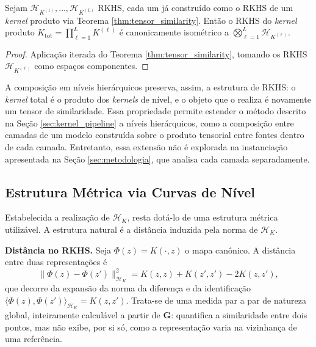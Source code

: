 \begin{corollary}\label{cor:recursive_composition}
Sejam $\mathcal{H}_{K^{(1)}}, \dots, \mathcal{H}_{K^{(L)}}$ RKHS, cada um já construído como o RKHS de um \textit{kernel} produto via Teorema \ref{thm:tensor_similarity}. Então o RKHS do \textit{kernel} produto $K_{\mathrm{tot}} = \prod_{\ell=1}^{L} K^{(\ell)}$ é canonicamente isométrico a $\bigotimes_{\ell=1}^{L} \mathcal{H}_{K^{(\ell)}}$.
\end{corollary}

\begin{proof}
Aplicação iterada do Teorema \ref{thm:tensor_similarity}, tomando os RKHS $\mathcal{H}_{K^{(\ell)}}$ como espaços componentes.
\end{proof}

A composição em níveis hierárquicos preserva, assim, a estrutura de RKHS: o \textit{kernel} total é o produto dos \textit{kernels} de nível, e o objeto que o realiza é novamente um tensor de similaridade. Essa propriedade permite estender o método descrito na Seção \ref{sec:kernel_pipeline} a níveis hierárquicos, como a composição entre camadas de um modelo construída sobre o produto tensorial entre fontes dentro de cada camada. Entretanto, essa extensão não é explorada na instanciação apresentada na Seção \ref{sec:metodologia}, que analisa cada camada separadamente.

\subsection{Estrutura Métrica via Curvas de Nível}\label{subsec:metric}
 
Estabelecida a realização de $\mathcal{H}_K$, resta dotá-lo de uma estrutura métrica utilizável. A estrutura natural é a distância induzida pela norma de $\mathcal{H}_K$.
 
\textbf{Distância no RKHS.} Seja $\Phi(z) = K(\cdot, z)$ o mapa canônico. A distância entre duas representações é
\begin{equation}\label{eq:rkhs_distance}
    \|\Phi(z) - \Phi(z')\|_{\mathcal{H}_K}^2 = K(z, z) + K(z', z') - 2 K(z, z'),
\end{equation}
que decorre da expansão da norma da diferença e da identificação $\langle \Phi(z), \Phi(z')\rangle_{\mathcal{H}_K} = K(z, z')$. Trata-se de uma medida par a par de natureza global, inteiramente calculável a partir de $\mathbf{G}$: quantifica a similaridade entre dois pontos, mas não exibe, por si só, como a representação varia na vizinhança de uma referência.
 
